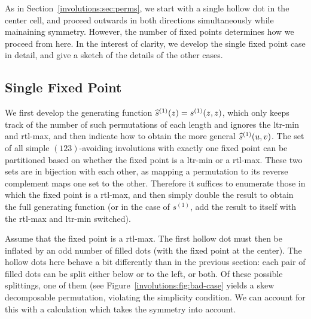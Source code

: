    As in Section~\ref{involutions:sec:perms}, we start with a single hollow
    dot in the center cell, and proceed outwards in both directions
    simultaneously while mainaining symmetry. However, the number of fixed
    points determines how we proceed from here. In the interest of clarity, we
    develop the single fixed point case in detail, and give a sketch of the
    details of the other cases. 

  \subsection{Single Fixed Point}
 

    We first develop the generating function $\widehat{s}^{(1)}(z) = s^{(1)}(z,z)$, which
    only keeps track of the number of such permutations of each length and
    ignores the ltr-min and rtl-max, and then indicate how to obtain the
    more general $\widehat{s}^{(1)}(u,v)$. The set of all simple $(123)$-avoiding
    involutions with exactly one fixed point can be partitioned based on
    whether the fixed point is a ltr-min or a rtl-max. These two sets are
    in bijection with each other, as mapping a permutation to its reverse
    complement maps one set to the other. Therefore it suffices to enumerate
    those in which the fixed point is a rtl-max, and then simply double the
    result to obtain the full generating function (or in the case of $s^{(1)}$,
    add the result to itself with the rtl-max and ltr-min switched). 
  
    Assume that the fixed point is a rtl-max. The first hollow dot must then
    be inflated by an odd number of filled dots (with the fixed point at the
    center). The hollow dots here behave a bit differently than in the previous
    section: each pair of filled dots can be split either below or to the left,
    or both. Of these possible splittings, one of them (see
    Figure~\ref{involutions:fig:bad-case} yields a skew decomposable
    permutation, violating the simplicity condition. We can account for this
    with a calculation which takes the symmetry into account. 

